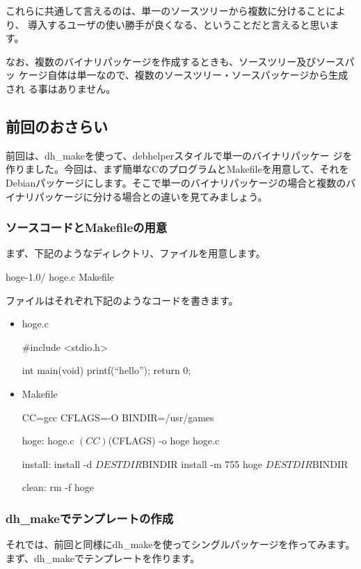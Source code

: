 \documentclass[mingoth,a4paper]{jsarticle}
\begin{document}
これらに共通して言えるのは、単一のソースツリーから複数に分けることにより、
導入するユーザの使い勝手が良くなる、ということだと言えると思います。

なお、複数のバイナリパッケージを作成するときも、ソースツリー及びソースパッ
ケージ自体は単一なので、複数のソースツリー・ソースパッケージから生成され
る事はありません。

\subsection{前回のおさらい}

前回は、dh\_makeを使って、debhelperスタイルで単一のバイナリパッケー
ジを作りました。今回は、まず簡単なCのプログラムとMakefileを用意して、それを
Debianパッケージにします。そこで単一のバイナリパッケージの場合と複数のバ
イナリパッケージに分ける場合との違いを見てみましょう。

\subsubsection{ソースコードとMakefileの用意}
 まず、下記のようなディレクトリ、ファイルを用意します。
 \begin{commandline}
hoge-1.0/
 hoge.c
 Makefile
 \end{commandline}
 ファイルはそれぞれ下記のようなコードを書きます。
 \begin{itemize}
  \item
       hoge.c
       \begin{commandline}
#include <stdio.h>
      
int main(void)
{
       printf(``hello\n'');
       return 0;
}
       \end{commandline}
  \item
       Makefile
       \begin{commandline}
CC=gcc
CFLAGS=-O
BINDIR=/usr/games
     
hoge: hoge.c
       $(CC) $(CFLAGS) -o hoge hoge.c
       
install:
       install -d ${DESTDIR}${BINDIR}
       install -m 755 hoge ${DESTDIR}${BINDIR}
       
clean:
       rm -f hoge
       \end{commandline}
 \end{itemize}

\subsubsection{dh\_makeでテンプレートの作成}
それでは、前回と同様にdh\_makeを使ってシングルパッケージを作ってみます。
まず、dh\_makeでテンプレートを作ります。
\end{document}
